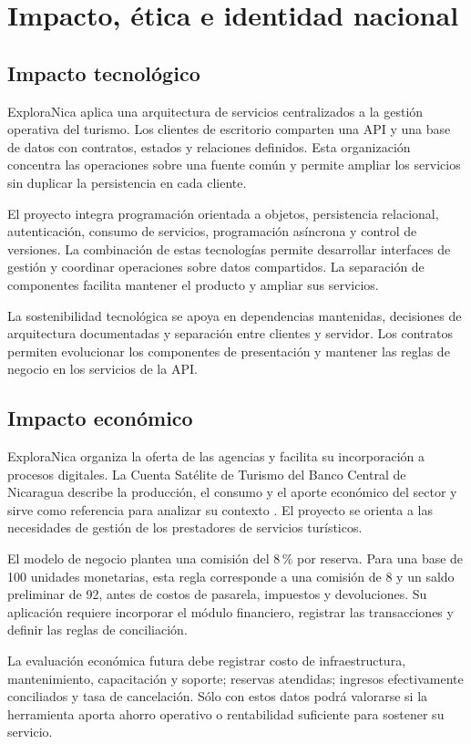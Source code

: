 \chapter{Impacto, ética e identidad nacional}
\label{cap:impacto}
\section{Impacto tecnológico}
ExploraNica aplica una arquitectura de servicios centralizados a la gestión operativa del turismo. Los clientes de escritorio comparten una API y una base de datos con contratos, estados y relaciones definidos. Esta organización concentra las operaciones sobre una fuente común y permite ampliar los servicios sin duplicar la persistencia en cada cliente.

El proyecto integra programación orientada a objetos, persistencia relacional, autenticación, consumo de servicios, programación asíncrona y control de versiones. La combinación de estas tecnologías permite desarrollar interfaces de gestión y coordinar operaciones sobre datos compartidos. La separación de componentes facilita mantener el producto y ampliar sus servicios.

La sostenibilidad tecnológica se apoya en dependencias mantenidas, decisiones de arquitectura documentadas y separación entre clientes y servidor. Los contratos permiten evolucionar los componentes de presentación y mantener las reglas de negocio en los servicios de la API.

\section{Impacto económico}
ExploraNica organiza la oferta de las agencias y facilita su incorporación a procesos digitales. La Cuenta Satélite de Turismo del Banco Central de Nicaragua describe la producción, el consumo y el aporte económico del sector y sirve como referencia para analizar su contexto \cite{ref2}. El proyecto se orienta a las necesidades de gestión de los prestadores de servicios turísticos.

El modelo de negocio plantea una comisión del 8\,\% por reserva. Para una base de 100 unidades monetarias, esta regla corresponde a una comisión de 8 y un saldo preliminar de 92, antes de costos de pasarela, impuestos y devoluciones. Su aplicación requiere incorporar el módulo financiero, registrar las transacciones y definir las reglas de conciliación.

La evaluación económica futura debe registrar costo de infraestructura, mantenimiento, capacitación y soporte; reservas atendidas; ingresos efectivamente conciliados y tasa de cancelación. Sólo con estos datos podrá valorarse si la herramienta aporta ahorro operativo o rentabilidad suficiente para sostener su servicio.

